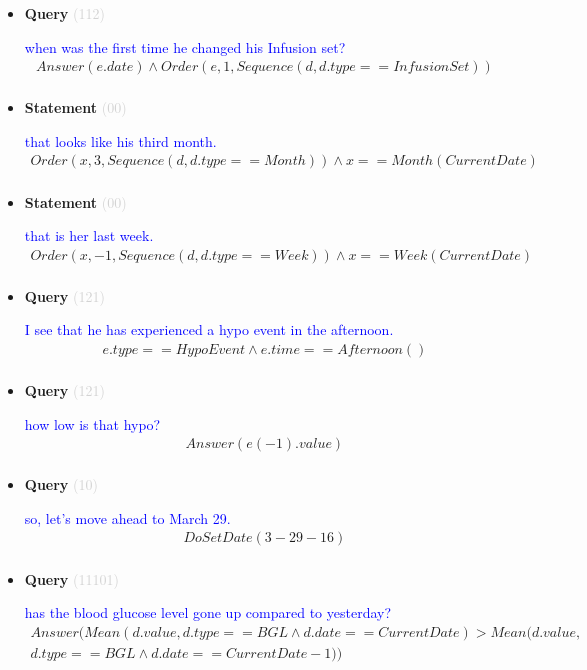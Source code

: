 \documentclass[11pt]{article}
\newcommand{\key}[1]{\textcolor{lightgray}{#1}}
\newcounter{CQuery}
\newcounter{CStatement}
\begin{document}
\begin{itemize}
\item
\textbf{Query\theCQuery} \key{(112)} \addtocounter{CQuery}{1}
\textcolor{blue}{ when was the first time he changed his Infusion set? }
\begin{multline*}
Answer(e.date) \wedge Order(e, 1, Sequence(d, d.type==InfusionSet)) \\ 
\end{multline*}


\item
\textbf{Statement\theCStatement} \key{(00)} \addtocounter{CStatement}{1}
\textcolor{blue}{ that looks like his third month. }
\begin{multline*}
Order(x, 3, Sequence(d, d.type==Month)) \wedge x==Month(CurrentDate) \\ 
\end{multline*}


\item
\textbf{Statement\theCStatement} \key{(00)} \addtocounter{CStatement}{1}
\textcolor{blue}{ that is her last week. }
\begin{multline*}
Order(x, -1, Sequence(d, d.type==Week)) \wedge x==Week(CurrentDate) \\ 
\end{multline*}


\item
\textbf{Query\theCQuery} \key{(121)} \addtocounter{CQuery}{1}
\textcolor{blue}{ I see that he has experienced a hypo event in the afternoon. }
\begin{multline*}
e.type==HypoEvent \wedge e.time==Afternoon() \\ 
\end{multline*}


\item
\textbf{Query\theCQuery} \key{(121)} \addtocounter{CQuery}{1}
\textcolor{blue}{ how low is that hypo? }
\begin{multline*}
Answer(e(-1).value) \\ 
\end{multline*}


\item
\textbf{Query\theCQuery} \key{(10)} \addtocounter{CQuery}{1}
\textcolor{blue}{ so, let's move ahead to March 29. }
\begin{multline*}
DoSetDate(3-29-16) \\ 
\end{multline*}


\item
\textbf{Query\theCQuery} \key{(11101)} \addtocounter{CQuery}{1}
\textcolor{blue}{ has the blood glucose level gone up compared to yesterday? }
\begin{multline*}
Answer(Mean(d.value, d.type==BGL \wedge d.date==CurrentDate) > Mean(d.value, \\ 
d.type==BGL \wedge d.date==CurrentDate-1)) \\ 
\end{multline*}



\end{itemize}
\end{document}
